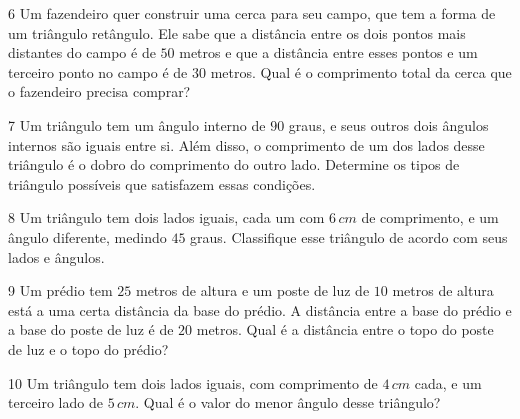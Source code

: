 
\num{6}  Um fazendeiro quer construir uma cerca para seu campo, que tem a
forma de um triângulo retângulo. Ele sabe que a distância entre os dois
pontos mais distantes do campo é de $50$ metros e que a distância entre
esses pontos e um terceiro ponto no campo é de $30$ metros. Qual é o
comprimento total da cerca que o fazendeiro precisa comprar?


\num{7}  Um triângulo tem um ângulo interno de $90$ graus, e seus outros dois
ângulos internos são iguais entre si. Além disso, o comprimento de um
dos lados desse triângulo é o dobro do comprimento do outro lado.
Determine os tipos de triângulo possíveis que satisfazem essas
condições.


\num{8}  Um triângulo tem dois lados iguais, cada um com $6\,cm$ de comprimento,
e um ângulo diferente, medindo $45$ graus. Classifique esse triângulo de
acordo com seus lados e ângulos.


\num{9}  Um prédio tem $25$ metros de altura e um poste de luz de $10$ metros de
altura está a uma certa distância da base do prédio. A distância entre a
base do prédio e a base do poste de luz é de $20$ metros. Qual é a
distância entre o topo do poste de luz e o topo do prédio?


\num{10}  Um triângulo tem dois lados iguais, com comprimento de $4\,cm$ cada, e
um terceiro lado de $5\,cm$. Qual é o valor do menor ângulo desse
triângulo?

